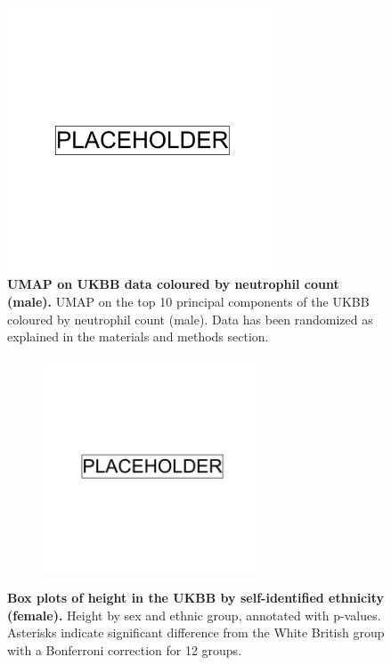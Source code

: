 \newpage

\begin{figure}
    \centering
    \includegraphics[width=0.7\textwidth]{placeholder.png}
    \caption[UMAP on UKBB data coloured by neutrophil count (male)]{\textbf{UMAP on UKBB data coloured by neutrophil count (male).} UMAP on the top 10 principal components of the UKBB coloured by neutrophil count (male). Data has been randomized as explained in the materials and methods section.}
    \label{fig:supp_ukbb_neutrophill_m}
\end{figure}

\newpage

\begin{figure}
    \centering
    \begin{subfigure}{\textwidth}
    \includegraphics[width=0.7\textwidth]{placeholder.png}
    \end{subfigure}
    \caption[Box plots of height in the UKBB by self-identified ethnicity (female)]{\textbf{Box plots of height in the UKBB by self-identified ethnicity (female).} Height by sex and ethnic group, annotated with p-values. Asterisks indicate significant difference from the White British group with a Bonferroni correction for 12 groups.}
    \label{fig:supp_box_height_f}
\end{figure}

